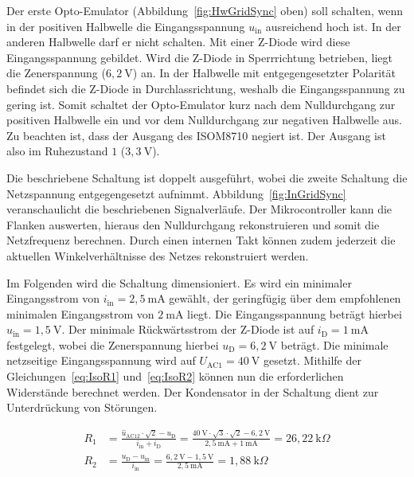 \documentclass[a4paper,12pt]{article}
\begin{document}
Der erste Opto-Emulator (Abbildung~\ref{fig:HwGridSync} oben) soll schalten, wenn in der positiven Halbwelle die Eingangsspannung $u_\text{in}$ ausreichend hoch ist. In der anderen Halbwelle darf er nicht schalten. Mit einer Z-Diode wird diese Eingangsspannung gebildet. Wird die Z-Diode in Sperrrichtung betrieben, liegt die Zenerspannung ($6,2~\text{V}$) an. In der Halbwelle mit entgegengesetzter Polarität befindet sich die Z-Diode in Durchlassrichtung, weshalb die Eingangsspannung zu gering ist. Somit schaltet der Opto-Emulator kurz nach dem Nulldurchgang zur positiven Halbwelle ein und vor dem Nulldurchgang zur negativen Halbwelle aus. Zu beachten ist, dass der Ausgang des ISOM8710 negiert ist. Der Ausgang ist also im Ruhezustand $1$ ($3,3~\text{V}$).

Die beschriebene Schaltung ist doppelt ausgeführt, wobei die zweite Schaltung die Netzspannung entgegengesetzt aufnimmt. Abbildung~\ref{fig:InGridSync} veranschaulicht die beschriebenen Signalverläufe. Der Mikrocontroller kann die Flanken auswerten, hieraus den Nulldurchgang rekonstruieren und somit die Netzfrequenz berechnen. Durch einen internen Takt können zudem jederzeit die aktuellen Winkelverhältnisse des Netzes rekonstruiert werden.

Im Folgenden wird die Schaltung dimensioniert. Es wird ein minimaler Eingangsstrom von $i_\text{in} = 2,5~\text{mA}$ gewählt, der geringfügig über dem empfohlenen minimalen Eingangsstrom von $2~\text{mA}$ liegt. Die Eingangsspannung beträgt hierbei $u_\text{in} = 1,5~\text{V}$. Der minimale Rückwärtsstrom der Z-Diode ist auf $i_\text{D} = 1~\text{mA}$ festgelegt, wobei die Zenerspannung hierbei $u_\text{D} = 6,2~\text{V}$ beträgt. Die minimale netzseitige Eingangsspannung wird auf $U_\text{AC1} = 40~\text{V}$ gesetzt. Mithilfe der Gleichungen~\ref{eq:IsoR1} und~\ref{eq:IsoR2} können nun die erforderlichen Widerstände berechnet werden. Der Kondensator in der Schaltung dient zur Unterdrückung von Störungen.

\begin{align}
    R_1 &= \frac{\widehat{u}_\text{AC12} \cdot \sqrt{2} - u_\text{D}}{i_\text{in} + i_\text{D}} = \frac{40~\text{V} \cdot \sqrt{3} \cdot \sqrt{2} - 6,2~\text{V}}{2,5~\text{mA} + 1~\text{mA}} = 26,22~\text{k}\Omega
    \label{eq:IsoR1} \\
    R_2 &= \frac{u_\text{D} - u_\text{in}}{i_\text{in}} = \frac{6,2~\text{V} - 1,5~\text{V}}{2,5~\text{mA}} = 1,88~\text{k}\Omega
    \label{eq:IsoR2}
\end{align}
\end{document}
